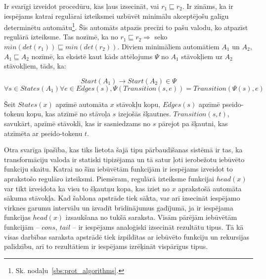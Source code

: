 Ir svarīgi izveidot procedūru, kas ļaus izsecināt, vai $r_1 {\sqsubseteq} r_2$. Ir zināms, ka ir iespējams katrai regulārai izteiksmei uzbūvēt minimālu akceptējošu galīgu determinētu automātu\footnote{Sk. nodaļu~\ref{sbs:prot_algorithms}.}. Šīs automāts atpazīs precīzi to pašu valodu, ko atpazīst regulārā izteiksme. Tas nozīmē, ka no $r_1 \sqsubseteq r_2 \Rightarrow$ seko $min(det (r_1)) \sqsubseteq min (det (r_2))$. Diviem minimāliem automātiem $A_1$ un $A_2$, $A_1 \sqsubseteq A_2$ nozīmē, ka eksistē kaut kāds attēlojums $\Psi$ no $A_1$ stāvokļiem uz $A_2$ stāvokļiem, tāds, ka:

\[
    Start (A_1) \to Start (A_2) \in \Psi
\]
\[
    \forall s \in States (A_1) \forall e \in Edges (s),
    \Psi (Transition (s, e)) = Transition (\Psi (s), e)
\]

Šeit $States (x)$ apzīmē automāta $x$ stāvokļu kopu, $Edges (s)$ apzīmē pseido-tokenu kopu, kas atzīmē no stāvoļa $s$ izejošās šķautnes. $Transition(s, t)$, savukārt, apzīmē stāvokli, kas ir sasniedzams no $s$ pārejot pa šķautni, kas atzīmēta ar pseido-tokenu $t$.

Otra svarīga īpašība, kas tiks lietota šajā tipu pārbaudīšanas sistēmā ir tas, ka transformāciju valoda ir statiski tipizējama un tā satur ļoti ierobežotu iebūvēto funkciju skaitu. Katrai no šīm iebūvētām funkcijām ir iespējams izveidot to aprakstošo regulāro izteiksmi. Piemēram, regulārā izteiksme funkcijai $head (x)$ var tikt izveidota ka visu to šķautņu kopa, kas iziet no $x$ aprakstošā automāta sākuma stāvokļa. Kad šablona apstrāde tiek sākta, var arī izsecināt iespējamo virknes garumu intervālu un izvadīt brīdinājumus gadījumā, ja ir iespējama funkcijas $head (x)$ izsaukšana no tukšā saraksta. Visām pārējām iebūvētām funkcijām -- $cons$, $tail$ -- ir iespējams analoģiski izsecināt rezultātu tipus. Tā kā visas darbības saraksta apstrādē tiek izpildītas ar iebūvēto funkciju un rekursijas palīdzību, arī to rezultātiem ir iespējams izrēķināt vispārīgus tipus.
